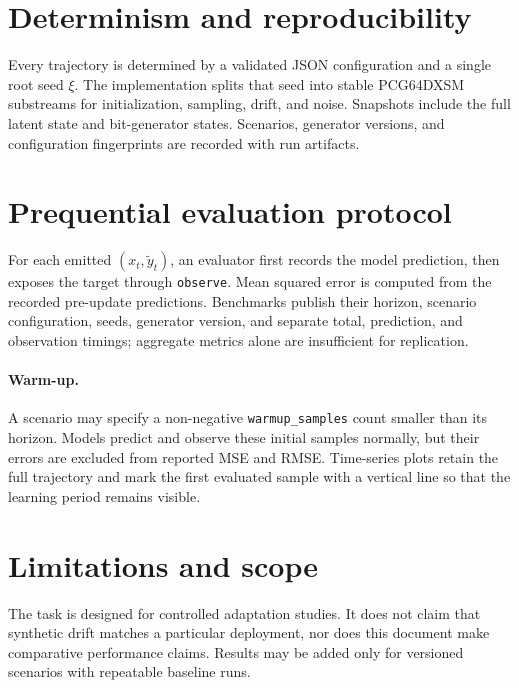\documentclass[11pt]{article}
\begin{document}
\section{Determinism and reproducibility}
Every trajectory is determined by a validated JSON configuration and a single
root seed $\xi$.  The implementation splits that seed into stable PCG64DXSM
substreams for initialization, sampling, drift, and noise.  Snapshots include
the full latent state and bit-generator states.  Scenarios, generator versions,
and configuration fingerprints are recorded with run artifacts.

\section{Prequential evaluation protocol}
For each emitted $(x_t,\tilde y_t)$, an evaluator first records the model
prediction, then exposes the target through \texttt{observe}.  Mean squared
error is computed from the recorded pre-update predictions.  Benchmarks publish
their horizon, scenario configuration, seeds, generator version, and separate
total, prediction, and observation timings; aggregate metrics alone are
insufficient for replication.

\paragraph{Warm-up.}
A scenario may specify a non-negative \texttt{warmup\_samples} count smaller
than its horizon.  Models predict and observe these initial samples normally,
but their errors are excluded from reported MSE and RMSE.  Time-series plots
retain the full trajectory and mark the first evaluated sample with a vertical
line so that the learning period remains visible.

\section{Limitations and scope}
The task is designed for controlled adaptation studies.  It does not claim
that synthetic drift matches a particular deployment, nor does this document
make comparative performance claims.  Results may be added only for versioned
scenarios with repeatable baseline runs.
\end{document}
